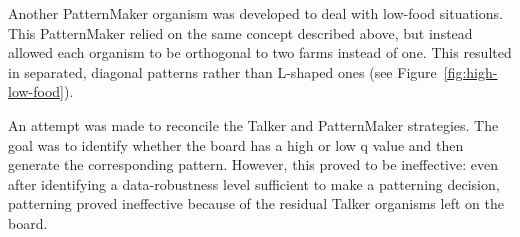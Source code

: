 Another PatternMaker organism was developed to deal with low-food
situations.  This PatternMaker relied on the same concept described
above, but instead allowed each organism to be orthogonal to two farms
instead of one.  This resulted in separated, diagonal patterns rather
than L-shaped ones (see Figure~\ref{fig:high-low-food}).

An attempt was made to reconcile the Talker and PatternMaker
strategies.  The goal was to identify whether the board has a high or
low q value and then generate the corresponding pattern.  However,
this proved to be ineffective: even after identifying a
data-robustness level sufficient to make a patterning decision,
patterning proved ineffective because of the residual Talker organisms
left on the board.
